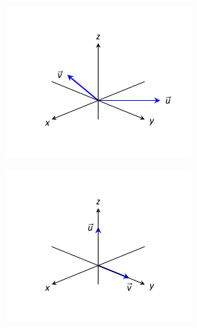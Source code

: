 \begin{Exercise}[
name={},
title={}, 
difficulty=0,
origin={\cite{GHC}}]
\begin{multicols}{2}
\begin{minipage}[m]{\linewidth}
\end{minipage}
\Question
\begin{minipage}[m]{\linewidth}
\centering
\includegraphics[width=\linewidth]{vector_geometry/introduction_to_vectors_and_lines/figures/fig10_02_ex_14}
\end{minipage}
\Question
\begin{minipage}[m]{\linewidth}
\centering
\includegraphics[width=\linewidth]{vector_geometry/introduction_to_vectors_and_lines/figures/fig10_02_ex_15}
\end{minipage}
\EndCurrentQuestion
\end{multicols}
\end{Exercise}

